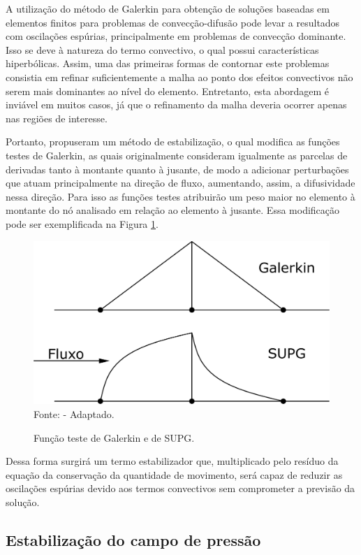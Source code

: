A utilização do método de Galerkin para obtenção de soluções baseadas em elementos finitos para problemas de convecção-difusão pode levar a resultados com oscilações espúrias, principalmente em problemas de convecção dominante. Isso se deve à natureza do termo convectivo, o qual possui características hiperbólicas. Assim, uma das primeiras formas de contornar este problemas consistia em refinar suficientemente a malha ao ponto dos efeitos convectivos não serem mais dominantes ao nível do elemento. Entretanto, esta abordagem é inviável em muitos casos, já que o refinamento da malha deveria ocorrer apenas nas regiões de interesse.

Portanto,  propuseram um método de estabilização, o qual modifica as funções testes de Galerkin, as quais originalmente consideram igualmente as parcelas de derivadas tanto à montante quanto à jusante, de modo a adicionar perturbações que atuam principalmente na direção de fluxo, aumentando, assim, a difusividade nessa direção. Para isso as funções testes atribuirão um peso maior no elemento à montante do nó analisado em relação ao elemento à jusante. Essa modificação pode ser exemplificada na Figura \ref{fig:Supg}.

\begin{figure}[h!]
    \centering
    \caption{Função teste de Galerkin e de SUPG.}
    \includegraphics[width=.6\linewidth]{Figuras/SUPG.pdf}
    \\Fonte:  - Adaptado.
    \label{fig:Supg}
\end{figure}

Dessa forma surgirá um termo estabilizador que, multiplicado pelo resíduo da equação da conservação da quantidade de movimento, será capaz de reduzir as oscilações espúrias devido aos termos convectivos sem comprometer a previsão da solução.

\subsection{Estabilização do campo de pressão}

